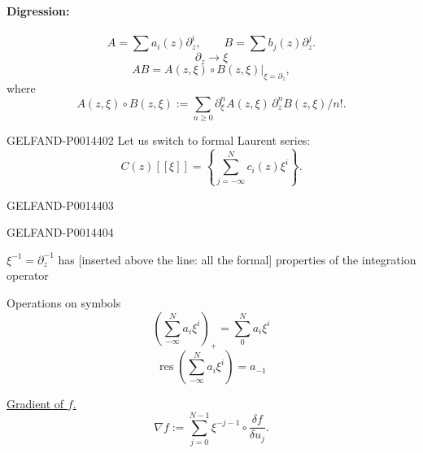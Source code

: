 \paragraph*{Digression: }
\begin{equation*}
A=\sum a_i(z)\partial_z^i,\qquad B=\sum b_j(z)\partial_z^j . \tag{4}
\end{equation*}
\[
\partial_z\longrightarrow\xi
\]
\begin{equation*}
AB=\left.A(z,\xi)\circ B(z,\xi)\right|_{\xi=\partial_z}, \tag{5}
\end{equation*}
where
\[
A(z,\xi)\circ B(z,\xi):=
\sum_{n\geq0}\partial_\xi^n A(z,\xi)\,\partial_z^n B(z,\xi)/n! .
\]

\begin{GelfandAdjacentEvidence}{GELFAND-P001440}{2}
Let us switch to formal Laurent series:
\begin{equation*}
C(z)[[\xi]]=\left\{\sum_{j=-\infty}^{N}c_i(z)\xi^i\right\}. \tag{6}
\end{equation*}
\end{GelfandAdjacentEvidence}
\begin{GelfandAdjacentEvidence}{GELFAND-P001440}{3}

\end{GelfandAdjacentEvidence}
\begin{GelfandAdjacentEvidence}{GELFAND-P001440}{4}


\(\xi^{-1}=\partial_z^{-1}\) has [inserted above the line: all the formal] properties of the integration operator
\end{GelfandAdjacentEvidence}


Operations on symbols
\begin{equation*}
\left(\sum_{-\infty}^{N}a_i\xi^i\right)_+=\sum_0^N a_i\xi^i \tag{7}
\end{equation*}
\begin{equation*}
\operatorname{res}\left(\sum_{-\infty}^{N}a_i\xi^i\right)=a_{-1} \tag{8}
\end{equation*}

\uline{Gradient of \(f\).}
\begin{equation*}
\nabla f:=\sum_{j=0}^{N-1}\xi^{-j-1}\circ\frac{\delta f}{\delta u_j}. \tag{9}
\end{equation*}


